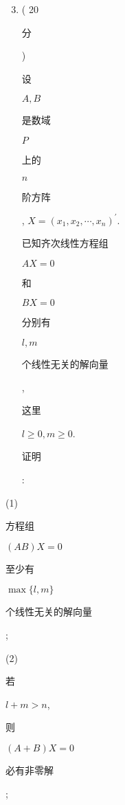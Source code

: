 \documentclass[10pt]{article}
\begin{document}
\begin{enumerate}
  \setcounter{enumi}{2}
  \item ( 20 \begin{CJK}{UTF8}{mj}分\end{CJK}) \begin{CJK}{UTF8}{mj}设\end{CJK} $A, B$ \begin{CJK}{UTF8}{mj}是数域\end{CJK} $P$ \begin{CJK}{UTF8}{mj}上的\end{CJK} $n$ \begin{CJK}{UTF8}{mj}阶方阵\end{CJK}, $X=\left(x_{1}, x_{2}, \cdots, x_{n}\right)^{\prime}$. \begin{CJK}{UTF8}{mj}已知齐次线性方程组\end{CJK} $A X=0$ \begin{CJK}{UTF8}{mj}和\end{CJK} $B X=0$ \begin{CJK}{UTF8}{mj}分别有\end{CJK} $l, m$ \begin{CJK}{UTF8}{mj}个线性无关的解向量\end{CJK}, \begin{CJK}{UTF8}{mj}这里\end{CJK} $l \geq 0, m \geq 0$. \begin{CJK}{UTF8}{mj}证明\end{CJK}:
\end{enumerate}
(1) \begin{CJK}{UTF8}{mj}方程组\end{CJK} $(A B) X=0$ \begin{CJK}{UTF8}{mj}至少有\end{CJK} $\max \{l, m\}$ \begin{CJK}{UTF8}{mj}个线性无关的解向量\end{CJK};

(2) \begin{CJK}{UTF8}{mj}若\end{CJK} $l+m>n$, \begin{CJK}{UTF8}{mj}则\end{CJK} $(A+B) X=0$ \begin{CJK}{UTF8}{mj}必有非零解\end{CJK};
\end{document}

